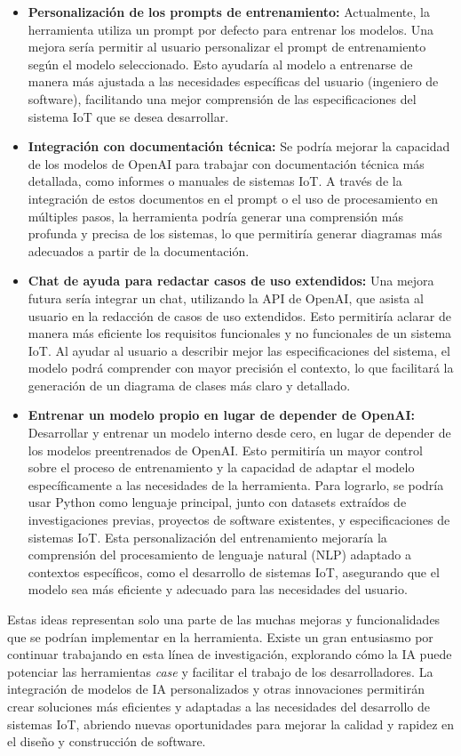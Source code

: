\begin{itemize}
	\item \textbf{Personalización de los prompts de entrenamiento:} Actualmente, la herramienta utiliza un prompt por defecto para entrenar los modelos. Una mejora sería permitir al usuario personalizar el prompt de entrenamiento según el modelo seleccionado. Esto ayudaría al modelo a entrenarse de manera más ajustada a las necesidades específicas del usuario (ingeniero de software), facilitando una mejor comprensión de las especificaciones del sistema IoT que se desea desarrollar.
	
	\item \textbf{Integración con documentación técnica: } Se podría mejorar la capacidad de los modelos de OpenAI para trabajar con documentación técnica más detallada, como informes o manuales de sistemas IoT. A través de la integración de estos documentos en el prompt o el uso de procesamiento en múltiples pasos, la herramienta podría generar una comprensión más profunda y precisa de los sistemas, lo que permitiría generar diagramas más adecuados a partir de la documentación.
	
	\item \textbf{Chat de ayuda para redactar casos de uso extendidos:} Una mejora futura sería integrar un chat, utilizando la API de OpenAI, que asista al usuario en la redacción de casos de uso extendidos. Esto permitiría aclarar de manera más eficiente los requisitos funcionales y no funcionales de un sistema IoT. Al ayudar al usuario a describir mejor las especificaciones del sistema, el modelo podrá comprender con mayor precisión el contexto, lo que facilitará la generación de un diagrama de clases más claro y detallado.
	
	\item \textbf{Entrenar un modelo propio en lugar de depender de OpenAI:} Desarrollar y entrenar un modelo interno desde cero, en lugar de depender de los modelos preentrenados de OpenAI. Esto permitiría un mayor control sobre el proceso de entrenamiento y la capacidad de adaptar el modelo específicamente a las necesidades de la herramienta. Para lograrlo, se podría usar Python como lenguaje principal, junto con datasets extraídos de investigaciones previas, proyectos de software existentes, y especificaciones de sistemas IoT. Esta personalización del entrenamiento mejoraría la comprensión del procesamiento de lenguaje natural (NLP) adaptado a contextos específicos, como el desarrollo de sistemas IoT, asegurando que el modelo sea más eficiente y adecuado para las necesidades del usuario.
	
\end{itemize}

Estas ideas representan solo una parte de las muchas mejoras y funcionalidades que se podrían implementar en la herramienta. Existe un gran entusiasmo por continuar trabajando en esta línea de investigación, explorando cómo la IA puede potenciar las herramientas \textit{case} y facilitar el trabajo de los desarrolladores. La integración de modelos de IA personalizados y otras innovaciones permitirán crear soluciones más eficientes y adaptadas a las necesidades del desarrollo de sistemas IoT, abriendo nuevas oportunidades para mejorar la calidad y rapidez en el diseño y construcción de software.